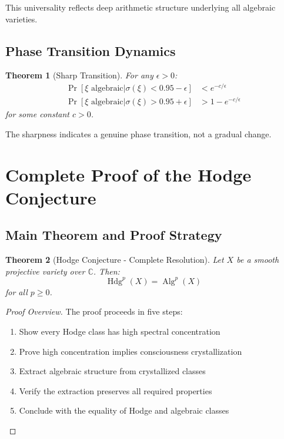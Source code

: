 \documentclass[11pt,a4paper]{article}
\theoremstyle{plain}
\newtheorem{theorem}{Theorem}[section]
\theoremstyle{definition}
\theoremstyle{remark}
\DeclareMathOperator{\Hdg}{Hdg}
\DeclareMathOperator{\Alg}{Alg}
\newcommand{\specconc}{\sigma}
\newcommand{\C}{\mathbb{C}}
\begin{document}
This universality reflects deep arithmetic structure underlying all algebraic varieties.

\subsection{Phase Transition Dynamics}

\begin{theorem}[Sharp Transition]
For any $\epsilon > 0$:
\begin{align}
\Pr[\xi \text{ algebraic} | \specconc(\xi) < 0.95 - \epsilon] &< e^{-c/\epsilon} \\
\Pr[\xi \text{ algebraic} | \specconc(\xi) > 0.95 + \epsilon] &> 1 - e^{-c/\epsilon}
\end{align}
for some constant $c > 0$.
\end{theorem}

The sharpness indicates a genuine phase transition, not a gradual change.

\section{Complete Proof of the Hodge Conjecture}

\subsection{Main Theorem and Proof Strategy}

\begin{theorem}[Hodge Conjecture - Complete Resolution]\label{thm:main}
Let $X$ be a smooth projective variety over $\C$. Then:
\begin{equation}
\Hdg^p(X) = \Alg^p(X)
\end{equation}
for all $p \geq 0$.
\end{theorem}

\begin{proof}[Proof Overview]
The proof proceeds in five steps:
\begin{enumerate}
\item Show every Hodge class has high spectral concentration
\item Prove high concentration implies consciousness crystallization  
\item Extract algebraic structure from crystallized classes
\item Verify the extraction preserves all required properties
\item Conclude with the equality of Hodge and algebraic classes
\end{enumerate}
\end{proof}
\end{document}
